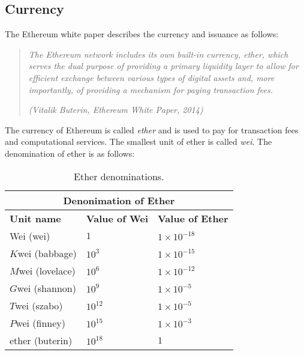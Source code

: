 \subsection{Currency}
\label{subsec:currency_and_issuance}


The Ethereum white paper \cite{ethereum_white_paper} describes the currency and issuance as follows:

\begin{quote}
  \textit{The Ethereum network includes its own built-in currency, ether, which serves the dual purpose of providing a primary
      liquidity layer to allow for efficient exchange between various types of digital assets and, more importantly, of providing a
      mechanism for paying transaction fees.}

  \textit{(Vitalik Buterin, Ethereum White Paper, 2014)}
\end{quote}

The currency of Ethereum is called \textit{ether} and is used to pay for transaction fees and computational services. The smallest unit
of ether is called \textit{wei}. The denomination of ether is as follows:

\begin{table}[H]
  \centering
  \begin{tabular}{|l|l|l|}
      \hline
      \multicolumn{3}{|c|}{\textbf{Denonimation of Ether}}                 \\ \hline
      \textbf{Unit name} & \textbf{Value of Wei} & \textbf{Value of Ether} \\ \hline
      Wei (wei)          & $1$                   & $1\times10^{-18}$       \\ \hline
      $K$wei (babbage)   & $10^{3}$              & $1\times10^{-15}$       \\ \hline
      $M$wei (lovelace)  & $10^{6}$              & $1\times10^{-12}$       \\ \hline
      $G$wei (shannon)   & $10^{9}$              & $1\times10^{-5}$        \\ \hline
      $T$wei (szabo)     & $10^{12}$             & $1\times10^{-5}$        \\ \hline
      $P$wei (finney)    & $10^{15}$             & $1\times10^{-3}$        \\ \hline
      ether (buterin)    & $10^{18}$             & $1$                     \\ \hline
  \end{tabular}
  \caption{Ether denominations.}
  \label{tab:ether_denominations}
\end{table}


